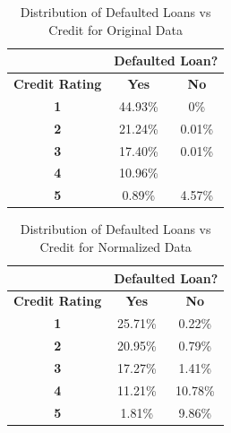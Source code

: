 \begin{table}[!htb]
\centering
\caption{Distribution of Defaulted Loans vs Credit for Original Data}
\label{table:dataorg}
\begin{tabular}{@{}ccc@{}}
\toprule
\multicolumn{1}{l}{\textbf{}} & \multicolumn{2}{l}{\textbf{Defaulted Loan?}} \\ \midrule
\textbf{Credit Rating}        & \textbf{Yes}          & \textbf{No}          \\ \midrule
\textbf{1}                    & 44.93\%               & 0\%                  \\ 
\textbf{2}                    & 21.24\%               & 0.01\%               \\ 
\textbf{3}                    & 17.40\%               & 0.01\%               \\ 
\textbf{4}                    & 10.96\%               &                      \\ 
\textbf{5}                    & 0.89\%                & 4.57\%               \\ \bottomrule
\end{tabular}
\end{table}

\begin{table}[]
\centering
\caption{Distribution of Defaulted Loans vs Credit for Normalized Data}
\label{table:datanormalized}
\begin{tabular}{@{}ccc@{}}
\toprule
\multicolumn{1}{l}{\textbf{}} & \multicolumn{2}{l}{\textbf{Defaulted Loan?}} \\ \midrule
\textbf{Credit Rating}        & \textbf{Yes}          & \textbf{No}          \\ \midrule
\textbf{1}                    & 25.71\%               & 0.22\%               \\ 
\textbf{2}                    & 20.95\%               & 0.79\%               \\ 
\textbf{3}                    & 17.27\%               & 1.41\%               \\ 
\textbf{4}                    & 11.21\%               & 10.78\%              \\ 
\textbf{5}                    & 1.81\%                & 9.86\%               \\ \bottomrule
\end{tabular}
\end{table}


